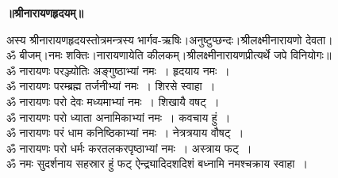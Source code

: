 \documentclass[twoside,top=1.7cm, bottom=1.7cm, outer=1cm,landscape, inner=1.5cm,a5paper,]{book}
\begin{document}
\newpage
\begin{center}{\bfseries\Huge ॥श्रीनारायणहृदयम्॥}\end{center}
अस्य श्रीनारायणहृदयस्तोत्रमन्त्रस्य भार्गव-ऋषिः।अनुष्टुप्छन्दः।श्रीलक्ष्मीनारायणो देवता।\\ॐ बीजम्।नमः शक्तिः।नारायणायेति कीलकम्।श्रीलक्ष्मीनारायणप्रीत्यर्थे जपे विनियोगः॥\\
ॐ नारायणः परञ्ज्योतिः अङ्गुष्ठाभ्यां नमः~। हृदयाय नमः~।\\
ॐ नारायणः परम्ब्रह्म 	तर्जनीभ्यां नमः~। शिरसे स्वाहा~।\\
ॐ नारायणः परो देवः मध्यमाभ्यां नमः~। शिखायै वषट्~।\\
ॐ नारायणः परो ध्याता अनामिकाभ्यां नमः~। कवचाय हुं~।\\
ॐ नारायणः परं धाम कनिष्ठिकाभ्यां नमः~। नेत्रत्रयाय वौषट्~।\\
ॐ नारायणः परो धर्मः करतलकरपृष्ठाभ्यां नमः~। अस्त्राय फट्~।\\
ॐ नमः सुदर्शनाय सहस्रार हुं फट् ऐन्द्र्यादिदशदिशं बध्नामि नमश्चक्राय स्वाहा~।
\end{document}
